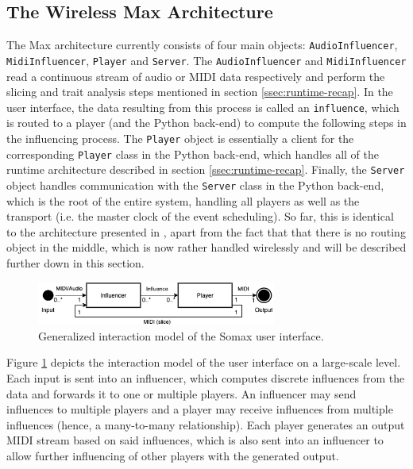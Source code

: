 \subsection{The Wireless Max Architecture}\label{ssec:max-architecture}
The Max architecture currently consists of four main objects: \texttt{AudioInfluencer}, \texttt{MidiInfluencer}, \texttt{Player} and \texttt{Server}. The \texttt{AudioInfluencer} and \texttt{Midi\-Influencer} read a continuous stream of audio or MIDI data respectively and perform the slicing and trait analysis steps mentioned in section \ref{ssec:runtime-recap}. In the user interface, the data resulting from this process is called an \texttt{influence}, which is routed to a player (and the Python back-end) to compute the following steps in the influencing process. The \texttt{Player} object is essentially a client for the corresponding \texttt{Player} class in the Python back-end, which handles all of the runtime architecture described in section \ref{ssec:runtime-recap}. Finally, the \texttt{Server} object handles communication with the \texttt{Server} class in the Python back-end, which is the root of the entire system, handling all players as well as the transport (i.e. the master clock of the event scheduling). So far, this is identical to the architecture presented in \cite{borg_2019}, apart from the fact that that there is no routing object in the middle, which is now rather handled wirelessly and will be described further down in this section.

 \begin{figure}[h!]
    \centering        
 	\includegraphics[width=0.7\textwidth,keepaspectratio]{figures/ui-generic-chain.png}
    \caption{Generalized interaction model of the Somax user interface.}
    \label{fig:somax-interaction}
\end{figure}


Figure \ref{fig:somax-interaction} depicts the interaction model of the user interface on a large-scale level. Each input is sent into an influencer, which computes discrete influences from the data and forwards it to one or multiple players. An influencer may send influences to multiple players and a player may receive influences from multiple influences (hence, a many-to-many relationship). Each player generates an output MIDI stream based on said influences, which is also sent into an influencer to allow further influencing of other players with the generated output. 

